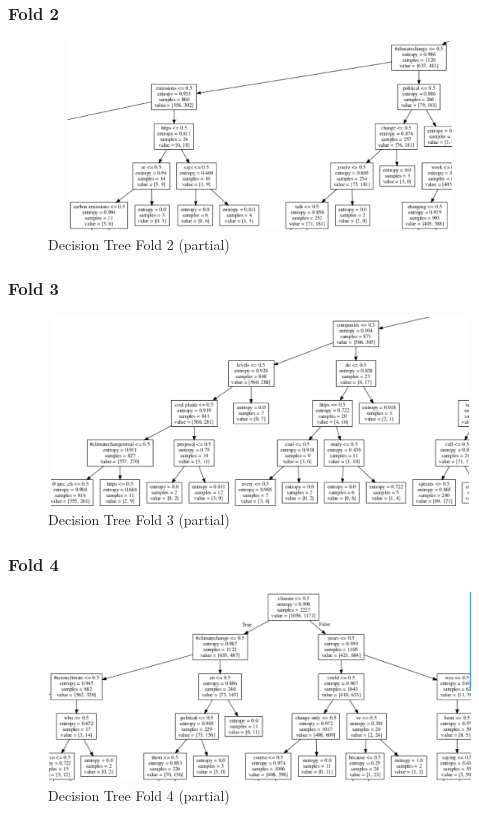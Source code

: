 \documentclass{article} %
\begin{document}
\subsubsection{Fold 2}

\begin{figure}[H]
	\includegraphics[height=5cm, width=17cm]{12.png}
	\caption{Decision Tree Fold 2 (partial)}
\end{figure}

\subsubsection{Fold 3}

\begin{figure}[H]
	\includegraphics[height=5cm, width=17cm]{13.png}
	\caption{Decision Tree Fold 3 (partial)}
\end{figure}

\subsubsection{Fold 4}

\begin{figure}[H]
	\includegraphics[height=5cm, width=17cm]{14.png}
	\caption{Decision Tree Fold 4 (partial)}
\end{figure}
\end{document}
